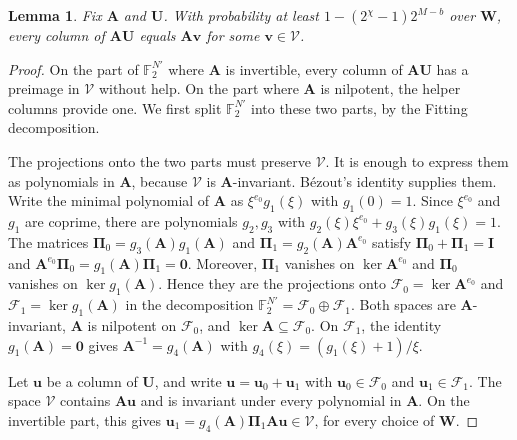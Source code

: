 \documentclass[b5paper, 10pt, abstract=true, captions=tableheading]{scrartcl}
\theoremstyle{plain}
\newtheorem{lemma}{Lemma}
\theoremstyle{definition}
\newcommand{\FF}{\mathds{F}}
\renewcommand{\vec}[1]{\symbf{#1}}
\newcommand{\mat}[1]{\symbf{#1}}
\begin{document}
\begin{lemma}\label{lem:wiedemann-preimages}
Fix $\mat A$ and $\mat U$. With probability at least
$1-(2^\chi-1)2^{M-b}$ over $\mat W$, every column of $\mat A\mat U$ equals
$\mat A\vec v$ for some $\vec v\in\mathcal V$.
\end{lemma}
\begin{proof}
On the part of $\FF_2^{N'}$ where $\mat A$ is invertible, every column of
$\mat A\mat U$ has a preimage in $\mathcal V$ without help. On the part
where $\mat A$ is nilpotent, the helper columns provide one. We first
split $\FF_2^{N'}$ into these two parts, by the Fitting decomposition.

The projections onto the two parts must preserve $\mathcal V$.
It is enough to express them as polynomials in $\mat A$, because
$\mathcal V$ is $\mat A$-invariant. B\'ezout's identity supplies them.
Write the minimal polynomial of $\mat A$ as $\xi^{e_0}g_1(\xi)$ with
$g_1(0)=1$. Since $\xi^{e_0}$ and $g_1$ are coprime, there are polynomials
$g_2,g_3$ with $g_2(\xi)\xi^{e_0}+g_3(\xi)g_1(\xi)=1$. The matrices
$\mat\Pi_0=g_3(\mat A)g_1(\mat A)$ and $\mat\Pi_1=g_2(\mat A)\mat A^{e_0}$
satisfy $\mat\Pi_0+\mat\Pi_1=\mat I$ and
$\mat A^{e_0}\mat\Pi_0=g_1(\mat A)\mat\Pi_1=\mat 0$. Moreover, $\mat\Pi_1$
vanishes on $\ker\mat A^{e_0}$ and $\mat\Pi_0$ vanishes on
$\ker g_1(\mat A)$. Hence they are the projections onto $\mathcal F_0=\ker\mat A^{e_0}$ and
$\mathcal F_1=\ker g_1(\mat A)$ in the decomposition
$\FF_2^{N'}=\mathcal F_0\oplus\mathcal F_1$. Both spaces are
$\mat A$-invariant, $\mat A$ is nilpotent on $\mathcal F_0$, and
$\ker\mat A\subseteq\mathcal F_0$. On $\mathcal F_1$, the identity
$g_1(\mat A)=\mat 0$ gives $\mat A^{-1}=g_4(\mat A)$ with
$g_4(\xi)=(g_1(\xi)+1)/\xi$.

Let $\vec u$ be a column of $\mat U$, and write
$\vec u=\vec u_0+\vec u_1$ with $\vec u_0\in\mathcal F_0$ and
$\vec u_1\in\mathcal F_1$. The space $\mathcal V$ contains $\mat A\vec u$
and is invariant under every polynomial in $\mat A$. On the invertible
part, this gives
$\vec u_1=g_4(\mat A)\mat\Pi_1\mat A\vec u\in\mathcal V$, for every choice
of $\mat W$.


\end{proof}
\end{document}
